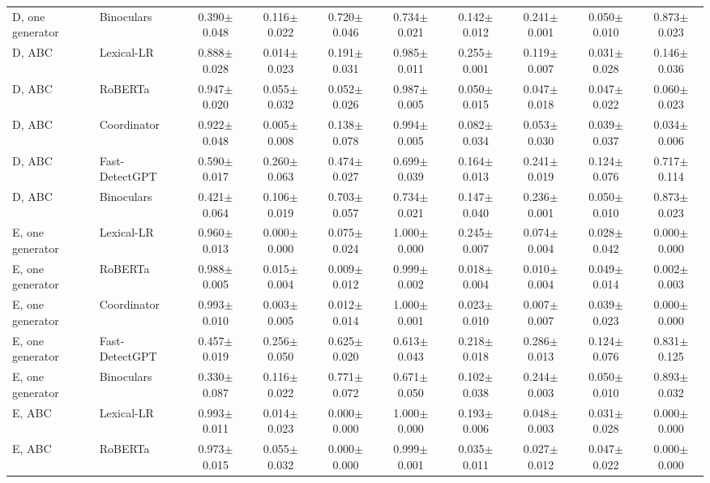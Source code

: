 \begin{table}[t]
\begin{tabular}{@{}llcccccccc@{}}
D, one generator & Binoculars & 0.390$\pm$0.048 & 0.116$\pm$0.022 & 0.720$\pm$0.046 & 0.734$\pm$0.021 & 0.142$\pm$0.012 & 0.241$\pm$0.001 & 0.050$\pm$0.010 & 0.873$\pm$0.023 \\
D, ABC & Lexical-LR & 0.888$\pm$0.028 & 0.014$\pm$0.023 & 0.191$\pm$0.031 & 0.985$\pm$0.011 & 0.255$\pm$0.001 & 0.119$\pm$0.007 & 0.031$\pm$0.028 & 0.146$\pm$0.036 \\
D, ABC & RoBERTa & 0.947$\pm$0.020 & 0.055$\pm$0.032 & 0.052$\pm$0.026 & 0.987$\pm$0.005 & 0.050$\pm$0.015 & 0.047$\pm$0.018 & 0.047$\pm$0.022 & 0.060$\pm$0.023 \\
D, ABC & Coordinator & 0.922$\pm$0.048 & 0.005$\pm$0.008 & 0.138$\pm$0.078 & 0.994$\pm$0.005 & 0.082$\pm$0.034 & 0.053$\pm$0.030 & 0.039$\pm$0.037 & 0.034$\pm$0.006 \\
D, ABC & Fast-DetectGPT & 0.590$\pm$0.017 & 0.260$\pm$0.063 & 0.474$\pm$0.027 & 0.699$\pm$0.039 & 0.164$\pm$0.013 & 0.241$\pm$0.019 & 0.124$\pm$0.076 & 0.717$\pm$0.114 \\
D, ABC & Binoculars & 0.421$\pm$0.064 & 0.106$\pm$0.019 & 0.703$\pm$0.057 & 0.734$\pm$0.021 & 0.147$\pm$0.040 & 0.236$\pm$0.001 & 0.050$\pm$0.010 & 0.873$\pm$0.023 \\
E, one generator & Lexical-LR & 0.960$\pm$0.013 & 0.000$\pm$0.000 & 0.075$\pm$0.024 & 1.000$\pm$0.000 & 0.245$\pm$0.007 & 0.074$\pm$0.004 & 0.028$\pm$0.042 & 0.000$\pm$0.000 \\
E, one generator & RoBERTa & 0.988$\pm$0.005 & 0.015$\pm$0.004 & 0.009$\pm$0.012 & 0.999$\pm$0.002 & 0.018$\pm$0.004 & 0.010$\pm$0.004 & 0.049$\pm$0.014 & 0.002$\pm$0.003 \\
E, one generator & Coordinator & 0.993$\pm$0.010 & 0.003$\pm$0.005 & 0.012$\pm$0.014 & 1.000$\pm$0.001 & 0.023$\pm$0.010 & 0.007$\pm$0.007 & 0.039$\pm$0.023 & 0.000$\pm$0.000 \\
E, one generator & Fast-DetectGPT & 0.457$\pm$0.019 & 0.256$\pm$0.050 & 0.625$\pm$0.020 & 0.613$\pm$0.043 & 0.218$\pm$0.018 & 0.286$\pm$0.013 & 0.124$\pm$0.076 & 0.831$\pm$0.125 \\
E, one generator & Binoculars & 0.330$\pm$0.087 & 0.116$\pm$0.022 & 0.771$\pm$0.072 & 0.671$\pm$0.050 & 0.102$\pm$0.038 & 0.244$\pm$0.003 & 0.050$\pm$0.010 & 0.893$\pm$0.032 \\
E, ABC & Lexical-LR & 0.993$\pm$0.011 & 0.014$\pm$0.023 & 0.000$\pm$0.000 & 1.000$\pm$0.000 & 0.193$\pm$0.006 & 0.048$\pm$0.003 & 0.031$\pm$0.028 & 0.000$\pm$0.000 \\
E, ABC & RoBERTa & 0.973$\pm$0.015 & 0.055$\pm$0.032 & 0.000$\pm$0.000 & 0.999$\pm$0.001 & 0.035$\pm$0.011 & 0.027$\pm$0.012 & 0.047$\pm$0.022 & 0.000$\pm$0.000 \\

\end{tabular}
\end{table}
